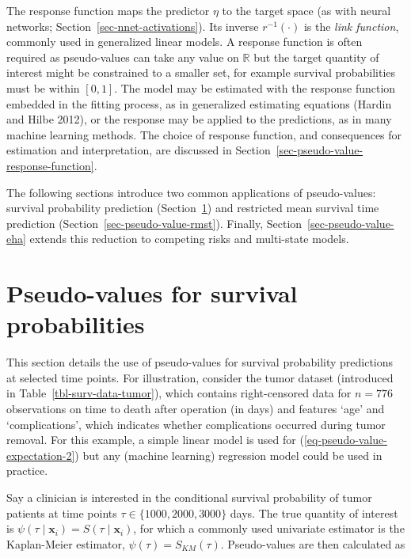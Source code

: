 \documentclass[
  letterpaper,
  krantz2]{style/krantz}
\begin{document}
The response function maps the predictor \(\eta\) to the target space
(as with neural networks; Section~\ref{sec-nnet-activations}). Its
inverse \(r^{-1}(\cdot)\) is the \emph{link function}, commonly used in
generalized linear models. A response function is
often required as pseudo-values can take any value on \(\mathbb{R}\) but
the target quantity of interest might be constrained to a smaller set,
for example survival probabilities must be within \([0,1]\). The model
may be estimated with the response function embedded in the fitting
process, as in generalized estimating equations (Hardin and Hilbe 2012),
or the response may be applied to the predictions, as in many machine
learning methods. The choice of response function, and consequences for
estimation and interpretation, are discussed in
Section~\ref{sec-pseudo-value-response-function}.

The following sections introduce two common applications of
pseudo-values: survival probability prediction
(Section~\ref{sec-pseudo-value-S}) and restricted mean survival time
prediction (Section~\ref{sec-pseudo-value-rmst}). Finally,
Section~\ref{sec-pseudo-value-eha} extends this reduction to competing
risks and multi-state models.

\section{Pseudo-values for survival
probabilities}\label{sec-pseudo-value-S}

This section details the use of pseudo-values for survival probability
predictions at selected time
points.
For illustration, consider the tumor dataset (introduced in
Table~\ref{tbl-surv-data-tumor}), which contains right-censored data for
\(n=776\) observations on time to death after operation (in days) and
features `age' and `complications', which indicates whether
complications occurred during tumor removal. For this example, a simple
linear model is used for (\ref{eq-pseudo-value-expectation-2}) but any
(machine learning) regression model could be used in practice.

Say a clinician is interested in the conditional survival probability of
tumor patients at time points \(\tau \in \{1000, 2000, 3000\}\) days.
The true quantity of interest is
\(\psi(\tau \mid \mathbf{x}_i) = S(\tau \mid \mathbf{x}_i)\), for which
a commonly used univariate estimator is the Kaplan-Meier estimator,
\(\psi(\tau) = S_{KM}(\tau)\). Pseudo-values are then calculated as
\end{document}
